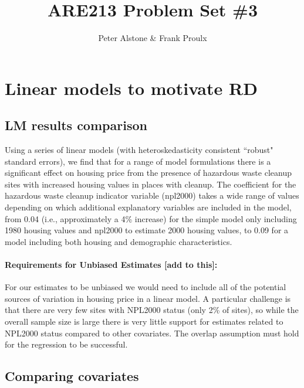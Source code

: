 \documentclass[letterpaper, 12pt]{article}
\begin{document}
\title{ARE213 Problem Set \#3}
\author{Peter Alstone \& Frank Proulx}
\maketitle

\section{Linear models to motivate RD}

\subsection{LM results comparison}



Using a series of linear models (with heteroskedasticity consistent ``robust" standard errors), we find that for a range of model formulations there is a significant effect on housing price from the presence of hazardous waste cleanup sites with increased housing values in places with cleanup.  The coefficient for the hazardous waste cleanup indicator variable (npl2000) takes a wide range of values depending on which additional explanatory variables are included in the model, from 0.04 (i.e., approximately a 4\% increase) for the simple model only including 1980 housing values and npl2000 to estimate 2000 housing values, to 0.09 for a model including both housing and demographic characteristics.  

\paragraph{Requirements for Unbiased Estimates [add to this]:}For our estimates to be unbiased we would need to include all of the potential sources of variation in housing price in a linear model.  A particular challenge is that there are very few sites with NPL2000 status (only 2\% of sites), so while the overall sample size is large there is very little support for estimates related to NPL2000 status compared to other covariates.  The overlap assumption must hold for the regression to be successful.  

\subsection{Comparing covariates}
\end{document}
